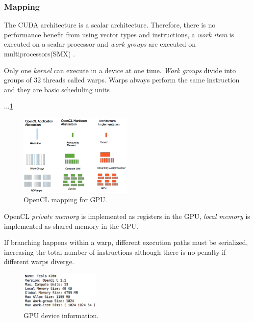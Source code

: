 \subsubsection{Mapping}
\par{The CUDA architecture is a scalar architecture. Therefore, there is no performance benefit from using vector types and 
    instructions, a \emph{work item} is executed on a scalar processor and \emph{work groups} are executed on multiprocessors(SMX)
    \cite{gpu_opencl_cuda,gpu_opencl_opt_slides}.}

\par{Only one \emph{kernel} can execute in a device at one time. \emph{Work groups} divide into groups of 32 threads called warps. 
    Warps always perform the same instruction and they are basic scheduling units \cite{gpu_opencl_opt_slides}.}

\par{...\ref{GpuModel}}

\begin{figure}[!h]
    \centering
    \includegraphics[width=0.5\textwidth]{figures/gpu_model.png}
    \caption{OpenCL mapping for GPU.}
    \label{GpuModel}
\end{figure}


\par{OpenCL \emph{private memory} is implemented as registers in the GPU, \emph{local memory} is implemented as shared memory 
    in the GPU\cite{gpu_opencl_opt_slides}.}

\par{If branching happens within a warp, different execution paths must be serialized, increasing the total number of 
    instructions although there is no penalty if different warps diverge\cite{gpu_opencl_opt_slides}.}

\begin{figure}[!h]
    \centering
    \includegraphics[width=0.35\textwidth]{figures/gpu_device_info.png}
    \caption{GPU device information.}
    \label{GpuDeviceInfo}
\end{figure}

